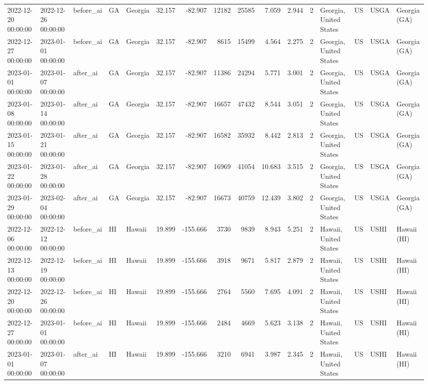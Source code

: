 \begin{tabular}{lllllrrrrrrlllll}
2022-12-20 00:00:00 & 2022-12-26 00:00:00 & before\_ai & GA & Georgia & 32.157 & -82.907 & 12182 & 25585 & 7.059 & 2.944 & 2 & Georgia, United States & US & USGA & Georgia (GA) \\
2022-12-27 00:00:00 & 2023-01-01 00:00:00 & before\_ai & GA & Georgia & 32.157 & -82.907 & 8615 & 15499 & 4.564 & 2.275 & 2 & Georgia, United States & US & USGA & Georgia (GA) \\
2023-01-01 00:00:00 & 2023-01-07 00:00:00 & after\_ai & GA & Georgia & 32.157 & -82.907 & 11386 & 24294 & 5.771 & 3.001 & 2 & Georgia, United States & US & USGA & Georgia (GA) \\
2023-01-08 00:00:00 & 2023-01-14 00:00:00 & after\_ai & GA & Georgia & 32.157 & -82.907 & 16657 & 47432 & 8.544 & 3.051 & 2 & Georgia, United States & US & USGA & Georgia (GA) \\
2023-01-15 00:00:00 & 2023-01-21 00:00:00 & after\_ai & GA & Georgia & 32.157 & -82.907 & 16582 & 35932 & 8.442 & 2.813 & 2 & Georgia, United States & US & USGA & Georgia (GA) \\
2023-01-22 00:00:00 & 2023-01-28 00:00:00 & after\_ai & GA & Georgia & 32.157 & -82.907 & 16969 & 41054 & 10.683 & 3.515 & 2 & Georgia, United States & US & USGA & Georgia (GA) \\
2023-01-29 00:00:00 & 2023-02-04 00:00:00 & after\_ai & GA & Georgia & 32.157 & -82.907 & 16673 & 40759 & 12.439 & 3.802 & 2 & Georgia, United States & US & USGA & Georgia (GA) \\
2022-12-06 00:00:00 & 2022-12-12 00:00:00 & before\_ai & HI & Hawaii & 19.899 & -155.666 & 3730 & 9839 & 8.943 & 5.251 & 2 & Hawaii, United States & US & USHI & Hawaii (HI) \\
2022-12-13 00:00:00 & 2022-12-19 00:00:00 & before\_ai & HI & Hawaii & 19.899 & -155.666 & 3918 & 9671 & 5.817 & 2.879 & 2 & Hawaii, United States & US & USHI & Hawaii (HI) \\
2022-12-20 00:00:00 & 2022-12-26 00:00:00 & before\_ai & HI & Hawaii & 19.899 & -155.666 & 2764 & 5560 & 7.695 & 4.091 & 2 & Hawaii, United States & US & USHI & Hawaii (HI) \\
2022-12-27 00:00:00 & 2023-01-01 00:00:00 & before\_ai & HI & Hawaii & 19.899 & -155.666 & 2484 & 4669 & 5.623 & 3.138 & 2 & Hawaii, United States & US & USHI & Hawaii (HI) \\
2023-01-01 00:00:00 & 2023-01-07 00:00:00 & after\_ai & HI & Hawaii & 19.899 & -155.666 & 3210 & 6941 & 3.987 & 2.345 & 2 & Hawaii, United States & US & USHI & Hawaii (HI) \\

\end{tabular}
